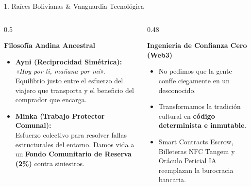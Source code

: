 \documentclass[10pt,aspectratio=169]{beamer}
\begin{document}
\begin{frame}{1. Raíces Bolivianas \& Vanguardia Tecnológica}
  \begin{columns}[T]
    \begin{column}{0.5\textwidth}
      \begin{block}{\textbf{Filosofía Andina Ancestral}}
        \begin{itemize}
          \item \textbf{Ayni (Reciprocidad Simétrica):}\\
          \textit{«Hoy por ti, mañana por mí».}\\
          Equilibrio justo entre el esfuerzo del viajero que transporta y el beneficio del comprador que encarga.
          \item \textbf{Minka (Trabajo Protector Comunal):}\\
          Esfuerzo colectivo para resolver fallas estructurales del entorno. Damos vida a un \textbf{Fondo Comunitario de Reserva (2\%)} contra siniestros.
        \end{itemize}
      \end{block}
    \end{column}
    \begin{column}{0.48\textwidth}
      \begin{exampleblock}{\textbf{Ingeniería de Confianza Cero (Web3)}}
        \begin{itemize}
          \item No pedimos que la gente confíe ciegamente en un desconocido.
          \item Transformamos la tradición cultural en \textbf{código determinista e inmutable}.
          \item Smart Contracts Escrow, Billeteras NFC Tangem y Oráculo Pericial IA reemplazan la burocracia bancaria.
        \end{itemize}
      \end{exampleblock}
    \end{column}
  \end{columns}
\end{frame}
\end{document}
